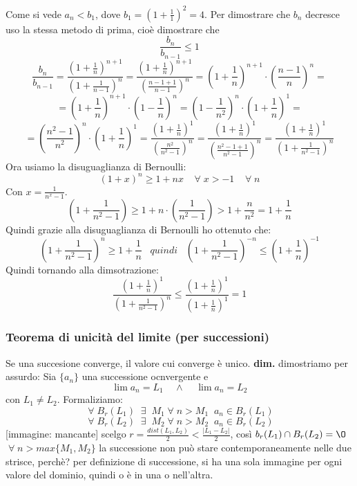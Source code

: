 \begin{itemize}
\[        \]
        Come si vede $a_n < b_1$, dove $b_1 = (1 + \frac{1}{1})^2 = 4$.\newline
        Per dimostrare che $b_n$ decresce uso la stessa metodo di prima, cioè dimostrare che
        \[
            \frac{b_n}{b_{n-1}} \leq 1
        \]
        \[
            \frac{b_n}{b_{n-1}} = \frac{(1+\frac{1}{n})^{n+1}}{(1+\frac{1}{n-1})^n} = \frac{(1+\frac{1}{n})^{n+1}}{(\frac{n-1+1}{n-1})^n} = (1+\frac{1}{n})^{n+1} \cdot  (\frac{n-1}{n})^n = 
        \]
        \[
            =(1+\frac{1}{n})^{n+1} \cdot (1-\frac{1}{n})^n = (1-\frac{1}{n^2})^n \cdot (1+\frac{1}{n})^1 = 
        \]
        \[
            = (\frac{n^2-1}{n^2})^n \cdot (1+\frac{1}{n})^1 = \frac{(1+\frac{1}{n})^1}{(\frac{n^2}{n^2-1})^n} = \frac{(1+\frac{1}{n})^1}{(\frac{n^2 -1+1}{n^2-1})^n} = \frac{(1+\frac{1}{n})^1}{(1 + \frac{1}{n^2-1})^n} 
        \]
        Ora usiamo la disuguaglianza di Bernoulli:
        \[
            (1+x)^n \geq 1 + nx \;\;\; \;\forall\;x > -1 \;\;\;\;\forall\;n
        \]
        Con $x = \frac{1}{n^x -1}$.\newline
        \[
             (1 + \frac{1}{n^2-1}) \geq 1 + n \cdot (\frac{1}{n^2-1}) > 1+ \frac{n}{n^2} = 1 + \frac{1}{n}
        \]
        Quindi grazie alla disuguaglianza di Bernoulli ho ottenuto che:
        \[
            (1 + \frac{1}{n^2-1})^n \geq 1 + \frac{1}{n} \;\;\;quindi \;\;\; (1 + \frac{1}{n^2-1})^{-n} \leq (1 + \frac{1}{n})^{-1}
        \]
        Quindi tornando alla dimsotrazione:
        \[
            \frac{(1+\frac{1}{n})^1}{(1 + \frac{1}{n^2-1})^n} \leq \frac{(1 + \frac{1}{n})^1}{(1 + \frac{1}{n})^1} = 1
        \]
\end{itemize}
\subsubsection*{Teorema di unicità del limite (per successioni)}
Se una succesione converge, il valore cui converge è unico.\newline
\textbf{dim.} dimostriamo per assurdo: \newline
Sia $\{a_n\}$ una successione ocnvergente e 
\[
    \lim a_n = L_1 \;\;\;\; \land \;\;\;\; \lim a_n = L_2
\]
con $L_1 \neq L_2$.\newline
Formaliziamo:
\[
    \;\forall\;B_r(L_1) \;\;\exists\;\; M_1 \;\forall\;n> M_1 \;\;a_n \in B_r(L_1)
\]
\[
    \;\forall\;B_r(L_2) \;\;\exists\;\; M_2 \;\forall\;n> M_2 \;\;a_n \in B_r(L_2)
\]
[immagine: mancante]\newline
scelgo $r = \frac{dist(L_1, L_2)}{2} < \frac{|L_1-L_2|}{2}$, così $b_r(L_1)\cap B_r(L_2) = \O$ \newline
$\;\forall\; n > max\{M_1, M_2\}$ la successione non può stare contemporaneamente nelle due strisce, perchè? per definizione di successione, si ha una sola immagine per ogni valore del dominio, quindi o è in una o nell'altra.
